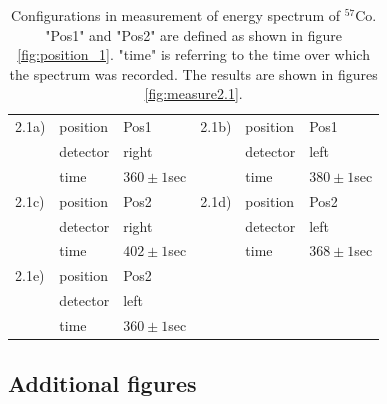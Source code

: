 \begin{table}[htp]
    \centering
    \begin{tabular}{|l|l|l||l|l|l|}
        \hline
        2.1a) & position  & Pos1         & 2.1b) & position  & Pos1\\
              & detector          & right        &       & detector          & left \\
              & time        & $360\pm1$sec &       & time        & $380\pm1$sec \\
        \hline 
        2.1c) & position  & Pos2         & 2.1d) & position  & Pos2         \\
              & detector          & right        &       & detector          & left \\
              & time        & $402\pm1$sec &       & time        & $368\pm1$sec \\
        \hline 
        2.1e) & position  & Pos2         \\
              & detector          & left \\
              & time        & $360\pm1$sec \\
    \cline{1-3}
    \end{tabular}
    \caption{
        Configurations in measurement of energy spectrum of $^{57}$Co.
        "Pos1" and "Pos2" are defined as shown in figure \ref{fig:position_1}. 
        "time" is referring to the time over which the spectrum was recorded. 
        The results are shown in figures \ref{fig:measure2.1}.
        }
    \label{tab:config2}
\end{table}
\clearpage

\subsection{Additional figures}
